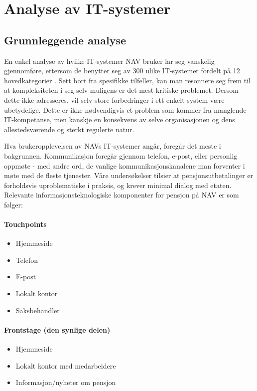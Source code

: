 \documentclass[informationsecurity]{gucmasterproject}
\begin{document}
\chapter{Analyse av IT-systemer}
\section{Grunnleggende analyse}
En enkel analyse av hvilke IT-systemer NAV bruker lar seg vanskelig gjennomføre, ettersom de benytter seg av 300 ulike IT-systemer fordelt på 12 hovedkategorier \cite{sokelys}. Sett bort fra spesifikke tilfeller, kan man resonnere seg frem til at kompleksiteten i seg selv muligens er det mest kritiske problemet. Dersom dette ikke adresseres, vil selv store forbedringer i ett enkelt system være ubetydelige. Dette er ikke nødvendigvis et problem som kommer fra manglende IT-kompetanse, men kanskje en konsekvens av selve organisasjonen og dens allestedsværende og sterkt regulerte natur.

Hva brukeropplevelsen av NAVs IT-systemer angår, foregår det meste i bakgrunnen. Kommunikasjon foregår gjennom telefon, e-post, eller personlig oppmøte - med andre ord, de vanlige kommunikasjonskanalene man forventer i møte med de fleste tjenester. Våre undersøkelser tilsier at pensjonsutbetalinger er forholdsvis uproblematiske i praksis, og krever minimal dialog med etaten. Relevante informasjonsteknologiske komponenter for pensjon på NAV er som følger:

\subsubsection{Touchpoints}
\begin{itemize}
\item Hjemmeside
\item Telefon
\item E-post
\item Lokalt kontor
\item Saksbehandler
\end{itemize}

\subsubsection{Frontstage (den synlige delen)}
\begin{itemize}
\item Hjemmeside
\item Lokalt kontor med medarbeidere
\item Informasjon/nyheter om pensjon
\end{itemize}
\end{document}
